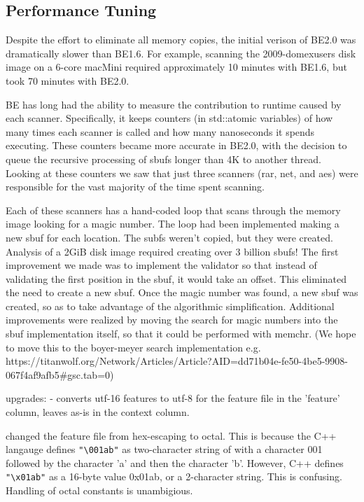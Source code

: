 \documentclass[5p]{elsarticle}
\begin{document}
\subsection{Performance Tuning}
Despite the effort to eliminate all memory copies, the initial verison
of BE2.0 was dramatically slower than BE1.6. For example, scanning the
2009-domexusers disk image on a 6-core macMini required approximately 10 minutes
with BE1.6, but took 70 minutes with BE2.0.

BE has long had the ability to measure the contribution to runtime
caused by each scanner. Specifically, it keeps counters (in
std::atomic variables) of how many times each scanner is called and
how many nanoseconds it spends executing. These counters became more
accurate in BE2.0, with the decision to queue the recursive processing
of sbufs longer than 4K to another thread. Looking at these counters
we saw that just three scanners (rar, net, and aes) were responsible
for the vast majority of the time spent scanning.

Each of these scanners has a hand-coded loop that scans through the
memory image looking for a magic number. The loop had been implemented
making a new sbuf for each location. The subfs weren't copied, but
they were created.  Analysis of a 2GiB disk image required creating
over 3 billion sbufs!  The first improvement we made was to implement
the validator so that instead of validating the first position in the
sbuf, it would take an offset. This eliminated the need to create a
new sbuf. Once the magic number was found, a new sbuf was created, so
as to take advantage of the algorithmic simplification. Additional
improvements were realized by moving the search for magic numbers into
the sbuf implementation itself, so that it could be performed with
memchr. (We hope to move this to the boyer-meyer search implementation
e.g. https://titanwolf.org/Network/Articles/Article?AID=dd71b04e-fe50-4be5-9908-067f4af9afb5#gsc.tab=0)


upgrades:
- converts utf-16 features to utf-8 for the feature file in the
'feature' column, leaves as-is in the context column.

changed the feature file from hex-escaping to octal. This is because
the C++ langauge defines \verb+"\001ab"+ as two-character string of
with a character 001 followed by the character 'a' and then the
character 'b'. However, C++ defines \verb+"\x01ab"+ as a 16-byte value
0x01ab, or a 2-character string. This is confusing. Handling of octal
constants is unambigious.
\end{document}
